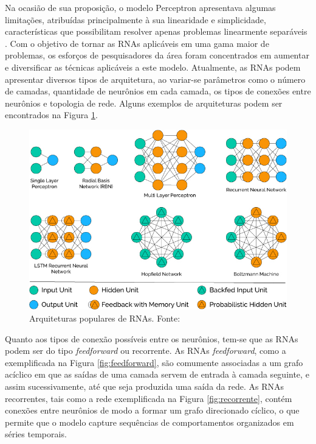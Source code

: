 Na ocasião de sua proposição, o modelo Perceptron apresentava algumas limitações, atribuídas principalmente à sua linearidade e simplicidade, características que possibilitam resolver apenas problemas linearmente separáveis \cite{Teresa:Livro}. Com o objetivo de tornar as RNAs aplicáveis em uma gama maior de problemas, os esforços de pesquisadores da área foram concentrados em aumentar e diversificar as técnicas aplicáveis a este modelo. Atualmente, as RNAs podem apresentar diversos tipos de arquitetura, ao variar-se parâmetros como o número de camadas, quantidade de neurônios em cada camada, os tipos de conexões entre neurônios e topologia de rede. Alguns exemplos de arquiteturas podem ser encontrados na Figura \ref{fig:popular_archs}.

\begin{figure}[!ht]
	\caption{Arquiteturas populares de RNAs. Fonte: \cite{rnas_tipos}}
	\label{fig:popular_archs}
	\includegraphics[width=\linewidth]{img/popular_archs}
\end{figure}


Quanto aos tipos de conexão possíveis entre os neurônios, tem-se que as RNAs podem ser do tipo \emph{feedforward} ou recorrente. As RNAs \emph{feedforward}, como a exemplificada na Figura \ref{fig:feedforward}, são comumente associadas a um grafo acíclico em que as saídas de uma camada servem de entrada à camada seguinte, e assim sucessivamente, até que seja produzida uma saída da rede. As RNAs recorrentes, tais como a rede exemplificada na Figura \ref{fig:recorrente}, contém conexões entre neurônios de modo a formar um grafo direcionado cíclico, o que permite que o modelo capture sequências de comportamentos organizados em séries temporais.


